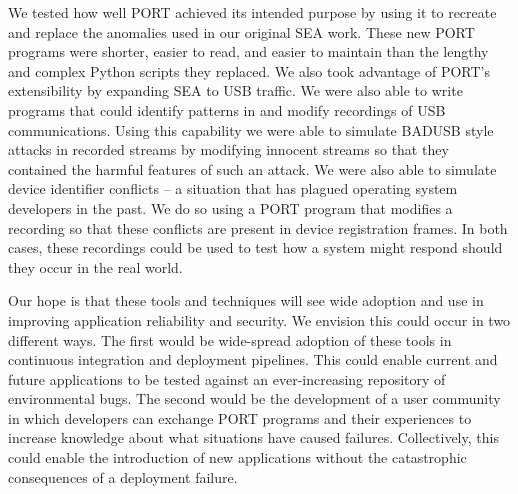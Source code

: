We tested how well PORT achieved its intended purpose by using it to recreate and
replace the anomalies used in our original SEA work.
These new PORT programs were shorter, easier to read, and easier to
maintain than the lengthy and complex Python scripts they replaced.
We also took advantage of PORT's extensibility by expanding SEA to USB
traffic.
We were also able to write programs that could identify patterns in and
modify recordings of USB communications.
Using this capability we were able to simulate
BADUSB style attacks in recorded streams by modifying innocent streams
so that they contained the harmful features of such an attack.
We were also able to simulate device identifier conflicts -- a situation that has
plagued operating system developers in the past.
We do so using a PORT program that modifies a recording so that these conflicts
are present in device registration frames.
In both cases, these recordings could be used
to test how a system might respond should they occur in the real world.

Our hope is that these tools and techniques will see wide
adoption and use in improving application reliability and security. We envision this could occur in two different ways. The first would be wide-spread adoption of these
tools in continuous
integration and deployment pipelines. This could enable current and future
applications to be tested against an ever-increasing repository of
environmental bugs.
The second would be the development of a user community in which developers can exchange PORT programs and their experiences to increase knowledge about what situations have caused failures.  Collectively, 
this could enable the introduction of new applications without the catastrophic consequences of a deployment failure. 

\vspace*{3ex plus 1fil}
